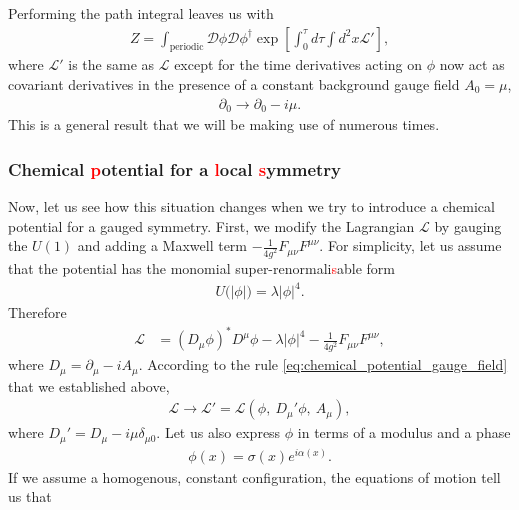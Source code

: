         Performing the path integral leaves us with
        \begin{align}
            Z= \int_{\text{periodic}} \mathcal{D}\phi \mathcal{D}\phi^{\dag} \exp \left[\int_0^{\tau} d\tau \int d^2x \mathcal{L'} \right],
        \end{align}
        where $\mathcal{L'}$ is the same as $\mathcal{L}$ except for the time derivatives acting on $\phi$ now act as covariant derivatives in the presence of a constant background gauge field $A_0=\mu$, \ie
        \begin{align}
            \partial_0 \rightarrow \partial_0 -i \mu. \label{eq:chemical_potential_gauge_field}
        \end{align}
        This is a general result that we will be making use of numerous times.
        \subsubsection{Chemical \textcolor{red}{p}otential for a \textcolor{red}{l}ocal \textcolor{red}{s}ymmetry}
        Now, let us see how this situation changes when we try to introduce a chemical potential for a gauged symmetry. First, we modify the Lagrangian $\mathcal{L}$ by gauging the $U(1)$ and adding a Maxwell term $-\frac{1}{4 g^2} F_{\mu \nu} F^{\mu \nu}$. For simplicity, let us assume that the potential has the monomial super-renormali\textcolor{red}{s}able form
        \begin{align}
            U\big(|\phi| \big) = \lambda |\phi|^4.
        \end{align}
        Therefore
        \begin{align}
            \mathcal{L} &=( D_{\mu} \phi)^* D^{\mu} \phi - \lambda |\phi|^4 - \frac{1}{4 g^2}F_{\mu \nu} F^{\mu \nu},
        \end{align}
        where $D_{\mu}= \partial_{\mu} - i A_{\mu}$. According to the rule \ref{eq:chemical_potential_gauge_field} that we established above,
        \begin{align}
            \mathcal{L} \rightarrow \mathcal{L}'= \mathcal{L}\left(\phi,\ D_{\mu}' \phi,\ A_{\mu} \right),
        \end{align}
        where $D_{\mu}' = D_{\mu} - i \mu \delta_{\mu 0}$.
        Let us also express $\phi$ in terms of a modulus and a phase
        \begin{align}
            \phi(x) = \sigma(x) e^{i \alpha(x)}.
        \end{align}
        If we assume a homogenous, constant configuration, the equations of motion tell us that

